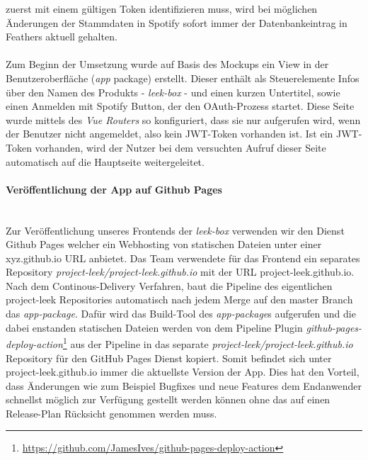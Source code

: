 \documentclass[10pt, a4paper]{article}
\begin{document}
\begin{onehalfspace}
zuerst  mit einem gültigen Token identifizieren muss, wird bei möglichen Änderungen der Stammdaten in Spotify sofort immer der Datenbankeintrag in Feathers
aktuell gehalten.
\\~\\
Zum Beginn der Umsetzung wurde auf Basis des Mockups ein View in der Benutzeroberfläche (\textit{app} package) erstellt. Dieser enthält als Steuerelemente Infos
über den Namen des Produkts - \textit{leek-box} - und einen kurzen Untertitel, sowie einen \glqq Anmelden mit Spotify\grqq{} Button, der den OAuth-Prozess startet.
Diese Seite wurde mittels des \textit{Vue Routers} so konfiguriert, dass sie nur aufgerufen wird, wenn der Benutzer nicht angemeldet, also kein JWT-Token
vorhanden ist. Ist ein JWT-Token vorhanden, wird der Nutzer bei dem versuchten Aufruf dieser Seite automatisch auf die Hauptseite weitergeleitet.

\paragraph*{Veröffentlichung der App auf Github Pages} $~$ \\
Zur Veröffentlichung unseres Frontends der \textit{leek-box} verwenden wir den Dienst Github Pages welcher ein Webhosting von statischen Dateien unter einer xyz.github.io URL anbietet.
Das Team verwendete für das Frontend ein separates Repository \textit{project-leek/project-leek.github.io} mit der URL project-leek.github.io.
Nach dem Continous-Delivery Verfahren, baut die Pipeline des eigentlichen project-leek Repositories automatisch nach jedem Merge auf den master Branch das \textit{app-package}.
Dafür wird das Build-Tool des \textit{app-package}s aufgerufen und die dabei enstanden statischen Dateien werden von dem Pipeline Plugin
\textit{github-pages-deploy-action}\footnote{\raggedright\url{https://github.com/JamesIves/github-pages-deploy-action}} aus der Pipeline in das separate
\textit{project-leek/project-leek.github.io} Repository für den GitHub Pages Dienst kopiert. Somit befindet sich unter project-leek.github.io immer die aktuellste Version der App.
Dies hat den Vorteil, dass Änderungen wie zum Beispiel Bugfixes und neue Features dem Endanwender schnellst möglich zur Verfügung gestellt werden können ohne das auf einen Release-Plan Rücksicht genommen werden muss.


\end{onehalfspace}
\end{document}
